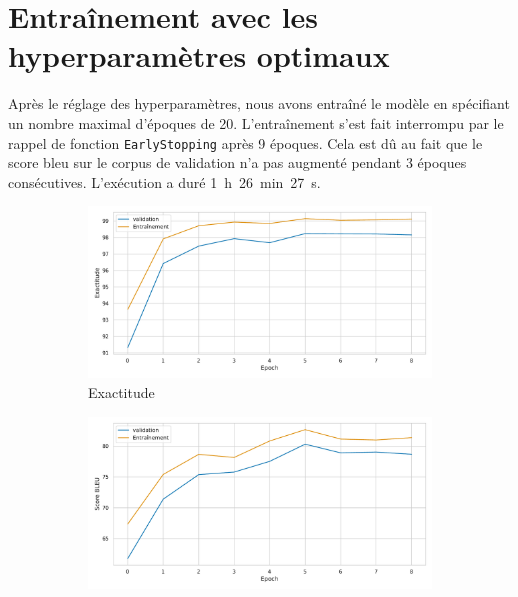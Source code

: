 \section{Entraînement avec les hyperparamètres optimaux}%
\label{sec.results.retrain}

Après le réglage des hyperparamètres, nous avons entraîné le modèle en spécifiant un nombre maximal d'époques de 20.
L'entraînement s'est fait interrompu par le rappel de fonction \verb|EarlyStopping| après 9 époques.
Cela est dû au fait que le score \gls{bleu} sur le corpus de validation n'a pas augmenté pendant 3 époques consécutives.
L'exécution a duré 1~h~26~min~27~s.

\begin{figure}[!hbt]
    \begin{subfigure}{.5\textwidth}
        \caption{Exactitude}
        \begin{center}
            \includegraphics[width=\textwidth]{assets/python/tuned-accuracy.pdf}
        \end{center}
        \label{fig.results.tuned.training.accuracy}
    \end{subfigure}
    \begin{subfigure}{.5\textwidth}
        \caption{}
        \begin{center}
            \includegraphics[width=\textwidth]{assets/python/tuned-bleu.pdf}

\end{center}
\end{subfigure}
\end{figure}
